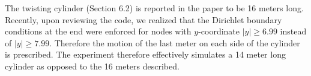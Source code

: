 \documentclass{scrartcl}
\begin{document}
The twisting cylinder (Section 6.2) is reported in the paper to be 16 meters long. Recently, upon reviewing the code, we realized that the Dirichlet boundary conditions at the end were enforced for nodes with $y$-coordinate $|y| \geq 6.99$ instead of $|y| \geq 7.99$. Therefore the motion of the last meter on each side of the cylinder is prescribed. The experiment therefore effectively simulates a 14 meter long cylinder as opposed to the 16 meters described.


\section*{}
\end{document}

